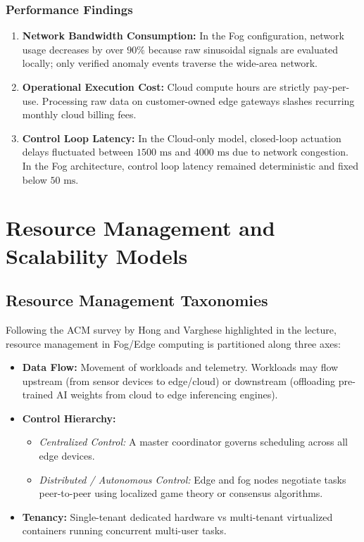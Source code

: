 \subsubsection{Performance Findings}
\begin{enumerate}[leftmargin=*]
  \item \textbf{Network Bandwidth Consumption:} In the Fog configuration, network usage decreases by over $90\%$ because raw sinusoidal signals are evaluated locally; only verified anomaly events traverse the wide-area network.
  \item \textbf{Operational Execution Cost:} Cloud compute hours are strictly pay-per-use. Processing raw data on customer-owned edge gateways slashes recurring monthly cloud billing fees.
  \item \textbf{Control Loop Latency:} In the Cloud-only model, closed-loop actuation delays fluctuated between $1500\text{ ms}$ and $4000\text{ ms}$ due to network congestion. In the Fog architecture, control loop latency remained deterministic and fixed below $50\text{ ms}$.
\end{enumerate}

\section{Resource Management and Scalability Models}
\subsection{Resource Management Taxonomies}
Following the ACM survey by Hong and Varghese highlighted in the lecture, resource management in Fog/Edge computing is partitioned along three axes:
\begin{itemize}[leftmargin=*]
  \item \textbf{Data Flow:} Movement of workloads and telemetry. Workloads may flow upstream (from sensor devices to edge/cloud) or downstream (offloading pre-trained AI weights from cloud to edge inferencing engines).
  \item \textbf{Control Hierarchy:}
    \begin{itemize}
      \item \emph{Centralized Control:} A master coordinator governs scheduling across all edge devices.
      \item \emph{Distributed / Autonomous Control:} Edge and fog nodes negotiate tasks peer-to-peer using localized game theory or consensus algorithms.
    \end{itemize}
  \item \textbf{Tenancy:} Single-tenant dedicated hardware vs multi-tenant virtualized containers running concurrent multi-user tasks.
\end{itemize}


